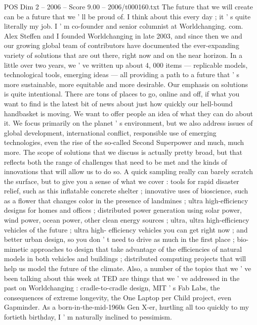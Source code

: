 \begin{textsample}{POS Dim 2 – 2006 – Score 9.00 – 2006/t000160.txt}  \label{ex:f2_pos_085}
The future that we will create can be a future that we ' ll be proud of.
I think about this every day ; it ' s quite literally my job.
I ' m co-founder and senior columnist at Worldchanging. com.
Alex Steffen and I founded Worldchanging in late 2003, and since then we and our growing global team of contributors have documented the ever-expanding variety of solutions that are out there, right now and on the near horizon.
In a little over two years, we ' ve written up about 4, 000 items — replicable models, technological tools, emerging ideas — all providing a path to a future that ' s more sustainable, more equitable and more desirable.
Our emphasis on solutions is quite intentional.
There are tons of places to go, online and off, if what you want to find is the latest bit of news about just how quickly our hell-bound handbasket is moving.
We want to offer people an idea of what they can do about it.
We focus primarily on the planet ' s environment, but we also address issues of global development, international conflict, responsible use of emerging technologies, even the rise of the so-called Second Superpower and much, much more.
The scope of solutions that we discuss is actually pretty broad, but that reflects both the range of challenges that need to be met and the kinds of innovations that will allow us to do so.
A quick sampling really can barely scratch the surface, but to give you a sense of what we cover : tools for rapid disaster relief, such as this inflatable concrete shelter ; innovative uses of bioscience, such as a flower that changes color in the presence of landmines ; ultra high-efficiency designs for homes and offices ; distributed power generation using solar power, wind power, ocean power, other clean energy sources ; ultra, ultra high-efficiency vehicles of the future ; ultra high- efficiency vehicles you can get right now ; and better urban design, so you don ' t need to drive as much in the first place ; bio-mimetic approaches to design that take advantage of the efficiencies of natural models in both vehicles and buildings ; distributed computing projects that will help us model the future of the climate.
Also, a number of the topics that we ' ve been talking about this week at TED are things that we ' ve addressed in the past on Worldchanging : cradle-to-cradle design, MIT ' s Fab Labs, the consequences of extreme longevity, the One Laptop per Child project, even Gapminder.
As a born-in-the-mid-1960s Gen X-er, hurtling all too quickly to my fortieth birthday, I ' m naturally inclined to pessimism.

\end{textsample}
